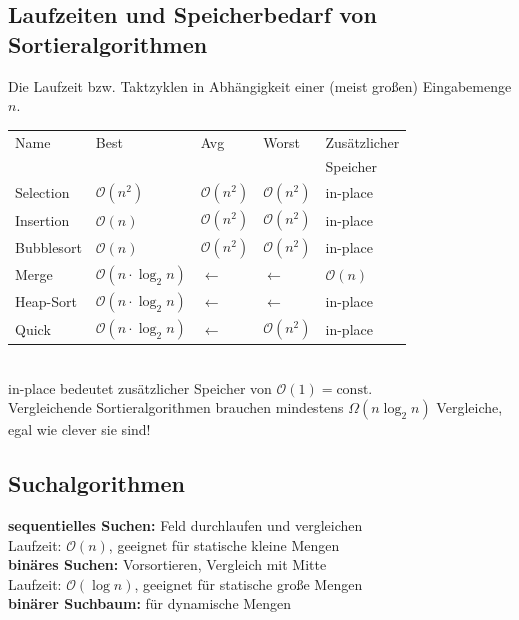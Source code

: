 \documentclass[fs, footer]{latex4ei}
\begin{document}
\begin{multicols*}{4}
{{\subsection{Laufzeiten und Speicherbedarf von Sortieralgorithmen}
Die Laufzeit bzw. Taktzyklen in Abhängigkeit einer (meist großen) Eingabemenge $n$.\\
\begin{tabular}{l|l|l|l|l}
	Name & Best & Avg & Worst & Zusätzlicher\\
	 & & & & Speicher\\ \hline
	Selection & $\mathcal O (n^2)$ & $\mathcal O (n^2)$ & $\mathcal O (n^2)$ & in-place\\
	Insertion & $\mathcal O (n)$ & $\mathcal O (n^2)$ & $\mathcal O (n^2)$ & in-place\\
	Bubblesort & $\mathcal O (n)$ & $\mathcal O (n^2)$ & $\mathcal O (n^2)$ & in-place\\
	Merge & $\mathcal O (n \cdot \log_2 n)$ & $\leftarrow$ & $\leftarrow$ & $\mathcal O (n)$\\ %
	Heap-Sort & $\mathcal O (n \cdot \log_2 n)$ & $\leftarrow$ & $\leftarrow$ & in-place\\	
	Quick & $\mathcal O (n \cdot \log_2 n)$ & $\leftarrow$ & $\mathcal O (n^2)$ & in-place\\
\end{tabular}\\
in-place bedeutet zusätzlicher Speicher von $\mathcal O (1) = \text{const.}$\\
Vergleichende Sortieralgorithmen brauchen mindestens $\Omega(n \log_2 n)$ Vergleiche, egal wie clever sie sind!





\subsection{Suchalgorithmen}
\textbf{sequentielles Suchen:} Feld durchlaufen und vergleichen\\
Laufzeit: $\mathcal O(n)$, geeignet für statische kleine Mengen\\
\textbf{binäres Suchen:} Vorsortieren, Vergleich mit Mitte\\
Laufzeit: $\mathcal O(\log n)$, geeignet für statische große Mengen\\
\textbf{binärer Suchbaum:} für dynamische Mengen\\

}}
\end{multicols*}
\end{document}
